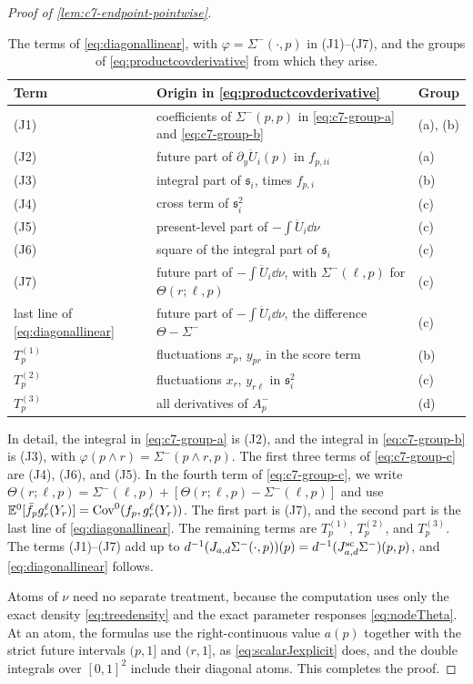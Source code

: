 \begin{proof}[Proof of \cref{lem:c7-endpoint-pointwise}]
\begin{table}[ht]
\centering\small
\begin{tabular}{@{}lll@{}}
\toprule
Term & Origin in \eqref{eq:productcovderivative} & Group\\
\midrule
(J1) & coefficients of $\Sigma^-(p,p)$ in \eqref{eq:c7-group-a} and \eqref{eq:c7-group-b} & (a), (b)\\
(J2) & future part of $\partial_y\ddot U_i(p)$ in $f_{p,ii}$ & (a)\\
(J3) & integral part of $\mathfrak s_i$, times $f_{p,i}$ & (b)\\
(J4) & cross term of $\mathfrak s_i^2$ & (c)\\
(J5) & present-level part of $-\int\ddot U_i\dd\nu$ & (c)\\
(J6) & square of the integral part of $\mathfrak s_i$ & (c)\\
(J7) & future part of $-\int\ddot U_i\dd\nu$, with $\Sigma^-(\ell,p)$ for $\Theta(r;\ell,p)$ & (c)\\
last line of \eqref{eq:diagonallinear} & future part of $-\int\ddot U_i\dd\nu$, the difference $\Theta-\Sigma^-$ & (c)\\
$T_p^{(1)}$ & fluctuations $x_p$, $y_{pr}$ in the score term & (b)\\
$T_p^{(2)}$ & fluctuations $x_r$, $y_{r\ell}$ in $\mathfrak s_i^2$ & (c)\\
$T_p^{(3)}$ & all derivatives of $A_p^-$ & (d)\\
\bottomrule
\end{tabular}
\caption{The terms of \eqref{eq:diagonallinear}, with
$\varphi=\Sigma^-(\cdot,p)$ in (J1)--(J7), and the groups of
\eqref{eq:productcovderivative} from which they arise.}
\label{tab:c7-matching}
\end{table}

In detail, the integral in \eqref{eq:c7-group-a} is (J2), and the
integral in \eqref{eq:c7-group-b} is (J3), with
$\varphi(p\wedge r)=\Sigma^-(p\wedge r,p)$. The first three terms of
\eqref{eq:c7-group-c} are (J4), (J6), and (J5). In the fourth
term of \eqref{eq:c7-group-c}, we write
$\Theta(r;\ell,p)=\Sigma^-(\ell,p)+[\Theta(r;\ell,p)-\Sigma^-(\ell,p)]$
and use $\mathbb E^0[\bar f_pg_r^\ell(Y_r)]=\operatorname{Cov}^0(f_p,g_r^\ell(Y_r))$. The
first part is (J7), and the second part is the last line of
\eqref{eq:diagonallinear}. The remaining terms are $T_p^{(1)}$,
$T_p^{(2)}$, and $T_p^{(3)}$. The terms (J1)--(J7) add up to
$d^{-1}(J_{a,d}\Sigma^-(\cdot,p))(p)
=d^{-1}(J^{\mathrm{sc}}_{a,d}\Sigma^-)(p,p)$, and \eqref{eq:diagonallinear}
follows.

Atoms of $\nu$ need no separate treatment, because the computation
uses only the exact density \eqref{eq:treedensity} and the exact
parameter responses \eqref{eq:nodeTheta}. At an atom, the formulas use the
right-continuous value $a(p)$ together with the strict future
intervals $(p,1]$ and $(r,1]$, as \eqref{eq:scalarJexplicit} does, and
the double integrals over $[0,1]^2$ include their diagonal atoms. This
completes the proof.
\end{proof}

